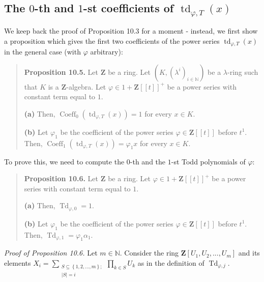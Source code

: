 \documentclass[numbers=enddot,12pt,final,onecolumn,notitlepage]{scrartcl}%
\begin{document}
\subsection{The $0$-th and $1$-st coefficients of $\operatorname*{td}%
\nolimits_{\varphi,T}\left(  x\right)  $}

We keep back the proof of Proposition 10.3 for a moment - instead, we first
show a proposition which gives the first two coefficients of the power series
$\operatorname*{td}\nolimits_{\varphi,T}\left(  x\right)  $ in the general
case (with $\varphi$ arbitrary):

\begin{quote}
\textbf{Proposition 10.5.} Let $\mathbf{Z}$ be a ring. Let $\left(  K,\left(
\lambda^{i}\right)  _{i\in\mathbb{N}}\right)  $ be a $\lambda$-ring such that
$K$ is a $\mathbf{Z}$-algebra. Let $\varphi\in1+\mathbf{Z}\left[  \left[
t\right]  \right]  ^{+}$ be a power series with constant term equal to $1$.

\textbf{(a)} Then, $\operatorname*{Coeff}\nolimits_{0}\left(
\operatorname*{td}\nolimits_{\varphi,T}\left(  x\right)  \right)  =1$ for
every $x\in K$.

\textbf{(b)} Let $\varphi_{1}$ be the coefficient of the power series
$\varphi\in\mathbf{Z}\left[  \left[  t\right]  \right]  $ before $t^{1}$.
Then, $\operatorname*{Coeff}\nolimits_{1}\left(  \operatorname*{td}%
\nolimits_{\varphi,T}\left(  x\right)  \right)  =\varphi_{1}x$ for every $x\in
K$.
\end{quote}

To prove this, we need to compute the $0$-th and the $1$-st Todd polynomials
of $\varphi$:

\begin{quote}
\textbf{Proposition 10.6.} Let $\mathbf{Z}$ be a ring. Let $\varphi
\in1+\mathbf{Z}\left[  \left[  t\right]  \right]  ^{+}$ be a power series with
constant term equal to $1$.

\textbf{(a)} Then, $\operatorname*{Td}\nolimits_{\varphi,0}=1$.

\textbf{(b)} Let $\varphi_{1}$ be the coefficient of the power series
$\varphi\in\mathbf{Z}\left[  \left[  t\right]  \right]  $ before $t^{1}$.
Then, $\operatorname*{Td}\nolimits_{\varphi,1}=\varphi_{1}\alpha_{1}$.
\end{quote}

\textit{Proof of Proposition 10.6.} Let $m\in\mathbb{N}$. Consider the ring
$\mathbf{Z}\left[  U_{1},U_{2},...,U_{m}\right]  $ and its elements
$X_{i}=\sum\limits_{\substack{S\subseteq\left\{  1,2,...,m\right\}
;\\\left\vert S\right\vert =i}}\prod\limits_{k\in S}U_{k}$ as in the
definition of $\operatorname*{Td}\nolimits_{\varphi,j}$.
\end{document}

